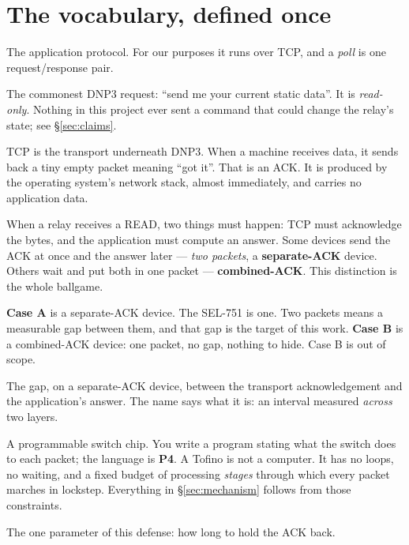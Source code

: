 \documentclass[10pt,a4paper,oneside]{article}
\begin{document}
\section{The vocabulary, defined once}

\begin{description}[leftmargin=1.4em,style=nextline,itemsep=0.35em]
\item[DNP3] The application protocol. For our purposes it runs over TCP, and a
  \emph{poll} is one request/response pair.
\item[A Class-0 READ] The commonest DNP3 request: ``send me your current static data''. It
  is \emph{read-only}. Nothing in this project ever sent a command that could change the
  relay's state; see \S\ref{sec:claims}.
\item[TCP acknowledgement (ACK)] TCP is the transport underneath DNP3. When a machine
  receives data, it sends back a tiny empty packet meaning ``got it''. That is an ACK. It
  is produced by the operating system's network stack, almost immediately, and carries no
  application data.
\item[Separate-ACK versus combined-ACK] When a relay receives a READ, two things must
  happen: TCP must acknowledge the bytes, and the application must compute an answer. Some
  devices send the ACK at once and the answer later --- \emph{two packets}, a
  \textbf{separate-ACK} device. Others wait and put both in one packet ---
  \textbf{combined-ACK}. This distinction is the whole ballgame.
\item[Case A / Case B] \textbf{Case A} is a separate-ACK device. The SEL-751 is one. Two
  packets means a measurable gap between them, and that gap is the target of this work.
  \textbf{Case B} is a combined-ACK device: one packet, no gap, nothing to hide. Case B is
  out of scope.
\item[CLRT --- Cross-Layer Response Time] The gap, on a separate-ACK device, between the
  transport acknowledgement and the application's answer. The name says what it is: an
  interval measured \emph{across} two layers.
\item[Tofino] A programmable switch chip. You write a program stating what the switch does
  to each packet; the language is \textbf{P4}. A Tofino is not a computer. It has no
  loops, no waiting, and a fixed budget of processing \emph{stages} through which every
  packet marches in lockstep. Everything in \S\ref{sec:mechanism} follows from those
  constraints.
\item[$D$] The one parameter of this defense: how long to hold the ACK back.
\end{description}
\end{document}
